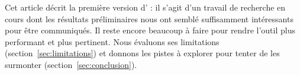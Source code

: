 Cet article décrit la première version d'{\Asak} : il s'agit d'un
travail de recherche en cours dont les résultats préliminaires nous
ont semblé suffisamment intéressants pour être communiqués. Il reste
encore beaucoup à faire pour rendre l'outil plus performant et plus
pertinent. Nous évaluons ses limitations
(section~\ref{sec:limitations}) et donnons les pistes à explorer pour
tenter de les surmonter (section~\ref{sec:conclusion}).
